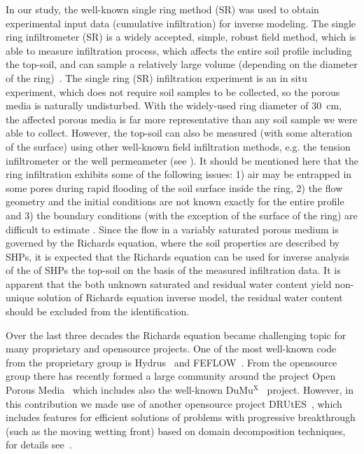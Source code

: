 \documentclass[review]{myarticle}
\begin{document}
In our study, the well-known single ring method (SR) was used to obtain experimental input data (cumulative infiltration) for inverse modeling. The  single ring infiltrometer (SR) is a widely accepted, simple, robust field method, which is able to measure infiltration process, which affects the entire soil profile including the top-soil,  and can sample a relatively large volume (depending on the diameter of the ring)~\citep{Cheng,ReynoldsWD}.  The single ring (SR) infiltration experiment is an in situ experiment, which does not require soil samples to be collected, so the porous media is naturally undisturbed. With the widely-used ring diameter of 30~cm, the affected porous media is far more representative than any soil sample  we were able to collect. However, the top-soil can also be measured (with some alteration of the surface) using other well-known field infiltration methods, e.g. the tension infiltrometer or the well permeameter (see \citep{AnguloJaramillo,ReynoldsWDGP}). 
 It should be mentioned here that the ring  infiltration exhibits some of the following issues: 1) air may be entrapped in some pores during rapid flooding of the soil surface inside the ring, 2) the flow geometry and the  initial conditions are not known exactly for the entire profile and 3) the boundary conditions (with the exception of the surface of the ring) are difficult to estimate  \citep{Jacka1,Fodor}.
Since the flow in a variably saturated porous medium is governed by the Richards equation, where the soil properties are described by SHPs, it is expected that the Richards equation can be used for inverse analysis of the of SHPs the top-soil on the basis of the measured infiltration data. It is apparent that the both unknown saturated and residual water content yield non-unique solution of Richards equation inverse model, the residual water content should be excluded from the identification.

Over the last three decades the Richards equation became challenging topic for many proprietary and opensource projects. 
 One of the most well-known code from the proprietary group is Hydrus~\citep{SimunekJ} and FEFLOW~\citep{feflow}. From the opensource group there has recently formed a large community around the project Open Porous Media~\citep{opm} which includes also the well-known DuMu$^{\textrm{X}}$~\citep{dumux} project. However, in this contribution we made use of another opensource project DRUtES~\citep{drutes}, which includes features for efficient solutions of problems with progressive breakthrough (such as the moving wetting front) based on domain decomposition techniques, for details see~\citep{mojecomp, mojejcam2, mojeamc2}.
\end{document}
